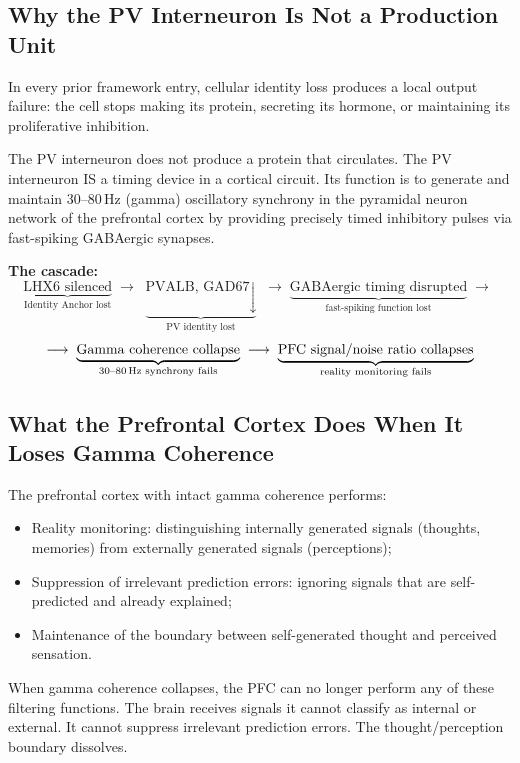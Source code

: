 \documentclass[12pt,a4paper]{article}
\newenvironment{derivenv}{%
  \begin{tcolorbox}[colback=lightgray,colframe=midgray,boxrule=0.5pt,
    arc=3pt,left=8pt,right=8pt,top=6pt,bottom=6pt,breakable]}{%
  \end{tcolorbox}}
\begin{document}
\subsection{Why the PV Interneuron Is Not a Production Unit}

In every prior framework entry, cellular identity loss
produces a local output failure: the cell stops making its
protein, secreting its hormone, or maintaining its
proliferative inhibition.

The PV interneuron does not produce a protein that circulates.
The PV interneuron IS a timing device in a cortical circuit.
Its function is to generate and maintain 30--80\,Hz (gamma)
oscillatory synchrony in the pyramidal neuron network of the
prefrontal cortex by providing precisely timed inhibitory
pulses via fast-spiking GABAergic synapses.

\begin{derivenv}
\textbf{The cascade:}
\[
\underbrace{
  \text{LHX6 silenced}
}_{\text{Identity Anchor lost}}
\;\longrightarrow\;
\underbrace{
  \text{PVALB, GAD67} \downarrow
}_{\text{PV identity lost}}
\;\longrightarrow\;
\underbrace{
  \text{GABAergic timing disrupted}
}_{\text{fast-spiking function lost}}
\;\longrightarrow\;
\]
\[
\longrightarrow\;
\underbrace{
  \text{Gamma coherence collapse}
}_{\text{30--80\,Hz synchrony fails}}
\;\longrightarrow\;
\underbrace{
  \text{PFC signal/noise ratio collapses}
}_{\text{reality monitoring fails}}
\]
\end{derivenv}

\subsection{What the Prefrontal Cortex Does When It Loses
Gamma Coherence}

The prefrontal cortex with intact gamma coherence performs:
\begin{itemize}
  \item Reality monitoring: distinguishing internally generated
    signals (thoughts, memories) from externally generated
    signals (perceptions);
  \item Suppression of irrelevant prediction errors: ignoring
    signals that are self-predicted and already explained;
  \item Maintenance of the boundary between self-generated
    thought and perceived sensation.
\end{itemize}

When gamma coherence collapses, the PFC can no longer perform
any of these filtering functions. The brain receives signals
it cannot classify as internal or external. It cannot suppress
irrelevant prediction errors. The thought/perception boundary
dissolves.
\end{document}

